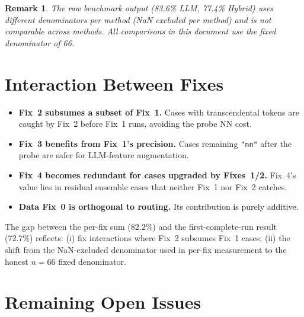 \documentclass[11pt,a4paper]{article}
\newtheorem{remark}{Remark}
\begin{document}
\begin{remark}
The raw benchmark output (83.6\% LLM, 77.4\% Hybrid) uses different
denominators per method (NaN excluded per method) and is not comparable
across methods.  All comparisons in this document use the fixed denominator
of 66.
\end{remark}

\section{Interaction Between Fixes}
\label{sec:interactions}

\begin{itemize}[leftmargin=*]
  \item \textbf{Fix~2 subsumes a subset of Fix~1.}  Cases with transcendental
    tokens are caught by Fix~2 before Fix~1 runs, avoiding the probe NN cost.
  \item \textbf{Fix~3 benefits from Fix~1's precision.}  Cases remaining
    \texttt{"nn"} after the probe are safer for LLM-feature augmentation.
  \item \textbf{Fix~4 becomes redundant for cases upgraded by Fixes~1/2.}
    Fix~4's value lies in residual ensemble cases that neither Fix~1 nor
    Fix~2 catches.
  \item \textbf{Data Fix~0 is orthogonal to routing.}  Its contribution
    is purely additive.
\end{itemize}

The gap between the per-fix sum (82.2\%) and the first-complete-run result
(72.7\%) reflects: (i) fix interactions where Fix~2 subsumes Fix~1 cases;
(ii) the shift from the NaN-excluded denominator used in per-fix measurement
to the honest $n{=}66$ fixed denominator.

\section{Remaining Open Issues}
\label{sec:open_issues}
\end{document}
